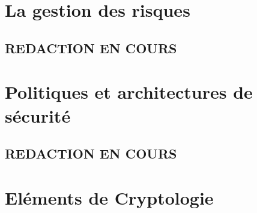 

\chapter{La gestion des risques}

\section{REDACTION EN COURS}

\chapter{Politiques et architectures de sécurité}

\section{REDACTION EN COURS}

\chapter{Eléments de Cryptologie}


